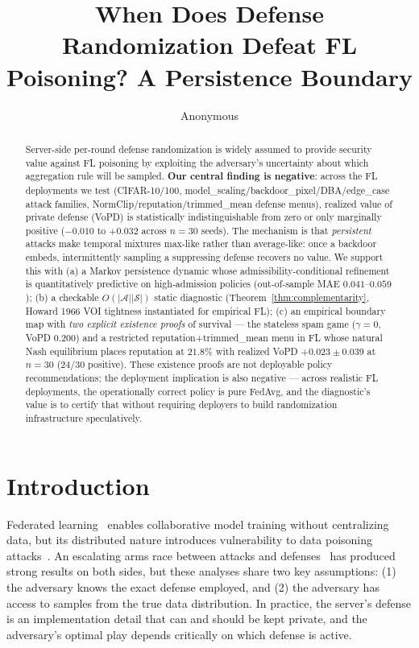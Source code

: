 \documentclass{article}
\title{When Does Defense Randomization Defeat FL Poisoning? A Persistence Boundary}
\author{Anonymous}
\begin{document}
\maketitle

\begin{abstract}
Server-side per-round defense randomization is widely assumed to provide security value against FL poisoning by exploiting the adversary's uncertainty about which aggregation rule will be sampled. \textbf{Our central finding is negative}: across the FL deployments we test (CIFAR-10/100, model\_scaling/backdoor\_pixel/DBA/edge\_case attack families, NormClip/reputation/trimmed\_mean defense menus), realized value of private defense (VoPD) is statistically indistinguishable from zero or only marginally positive ($-0.010$ to $+0.032$ across $n=30$ seeds). The mechanism is that \emph{persistent} attacks make temporal mixtures max-like rather than average-like: once a backdoor embeds, intermittently sampling a suppressing defense recovers no value. We support this with (a) a Markov persistence dynamic whose admissibility-conditional refinement is quantitatively predictive on high-admission policies (out-of-sample MAE $0.041$--$0.059$); (b) a checkable $O(|\mathcal{A}||\mathcal{S}|)$ static diagnostic (Theorem~\ref{thm:complementarity}, Howard 1966 VOI tightness instantiated for empirical FL); (c) an empirical boundary map with \emph{two explicit existence proofs} of survival --- the stateless spam game ($\gamma=0$, VoPD $0.200$) and a restricted reputation+trimmed\_mean menu in FL whose natural Nash equilibrium places reputation at $21.8\%$ with realized VoPD $\mathbf{+0.023 \pm 0.039}$ at $n=30$ ($24/30$ positive). These existence proofs are not deployable policy recommendations; the deployment implication is also negative --- across realistic FL deployments, the operationally correct policy is pure FedAvg, and the diagnostic's value is to certify that without requiring deployers to build randomization infrastructure speculatively.
\end{abstract}

\section{Introduction}
\label{sec:intro}

Federated learning~\citep{mcmahan2017communication} enables collaborative model training without centralizing data, but its distributed nature introduces vulnerability to data poisoning attacks~\citep{chen2017targeted,bagdasaryan2020backdoor}. An escalating arms race between attacks and defenses~\citep{wang2020attack,xie2019dba,pillutla2019robust,sun2019can,bhagoji2019analyzing} has produced strong results on both sides, but these analyses share two key assumptions: (1) the adversary knows the exact defense employed, and (2) the adversary has access to samples from the true data distribution. In practice, the server's defense is an implementation detail that can and should be kept private, and the adversary's optimal play depends critically on which defense is active.
\end{document}
